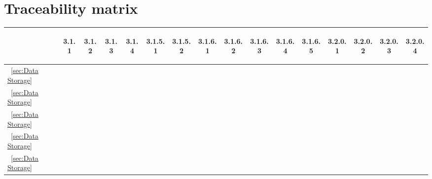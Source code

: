 \documentclass[12pt,a4paper]{article}
\begin{document}
\section{Traceability matrix}
\begin{center}
\begin{tabular}{|l||*{15}{c|}}
\hline
	&\begin{sideways}3.1.1\end{sideways} & \begin{sideways}3.1.2\end{sideways} & \begin{sideways}3.1.3\end{sideways} & \begin{sideways}3.1.4\end{sideways} &
	\begin{sideways}3.1.5.1\end{sideways} & \begin{sideways}3.1.5.2\end{sideways} & \begin{sideways}3.1.6.1\end{sideways} & \begin{sideways}3.1.6.2\end{sideways} & \begin{sideways}3.1.6.3\end{sideways} & \begin{sideways}3.1.6.4\end{sideways} & \begin{sideways}3.1.6.5\end{sideways} &
	\begin{sideways}3.2.0.1\end{sideways} & \begin{sideways}3.2.0.2\end{sideways} & \begin{sideways}3.2.0.3\end{sideways} & \begin{sideways}3.2.0.4\end{sideways}\\
\hline
\hline
~\ref{sec:Data Storage}	&	&	&	&	&	&	&	&	&	&	&	&	&	&	&	\\
\hline
~\ref{sec:Data Storage}	&	&	&	&	&	&	&	&	&	&	&	&	&	&	&	\\
\hline
~\ref{sec:Data Storage}	&	&	&	&	&	&	&	&	&	&	&	&	&	&	&	\\
\hline
~\ref{sec:Data Storage}	&	&	&	&	&	&	&	&	&	&	&	&	&	&	&	\\
\hline
~\ref{sec:Data Storage}	&	&	&	&	&	&	&	&	&	&	&	&	&	&	&	\\
\hline
\end{tabular}
\end{center}
\end{document}
